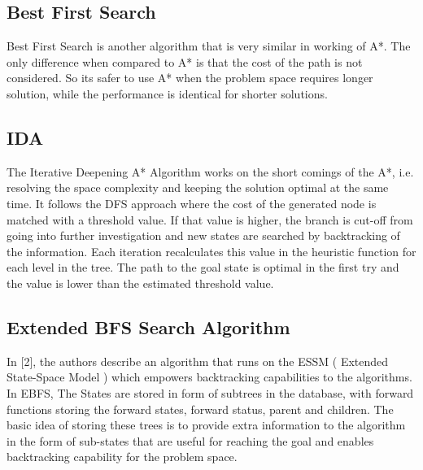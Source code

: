 \documentclass{svproc}
\begin{document}
\subsection{Best First Search}
 Best First Search is another algorithm that is very similar in working of A*. The only difference when compared to A* is that the cost of the path is not considered. So its safer to use A* when the problem space requires longer  solution, while the performance is identical for shorter solutions.
\subsection{IDA} 
The Iterative Deepening A* Algorithm works on the short comings of the A*, i.e. resolving the space complexity and keeping the solution optimal at the same time. It follows the DFS approach where the cost of the generated node is matched with a threshold value. If that value is higher, the branch is cut-off from going into further investigation and new states are searched by backtracking of the information. Each iteration recalculates this value in the heuristic function for each level in the tree. The path to the goal state is optimal in the first try and the value is lower than the estimated threshold value.
\subsection{Extended BFS Search Algorithm}



In [2], the authors describe an algorithm that runs on the ESSM ( Extended State-Space Model ) which empowers backtracking capabilities to the algorithms. In EBFS, The States are stored in form of subtrees in the database, with forward functions storing the forward states, forward status, parent and children. The basic idea of storing these trees is to provide extra information to the algorithm in the form of sub-states that are useful for reaching the goal and enables backtracking capability for the problem space.
\end{document}
